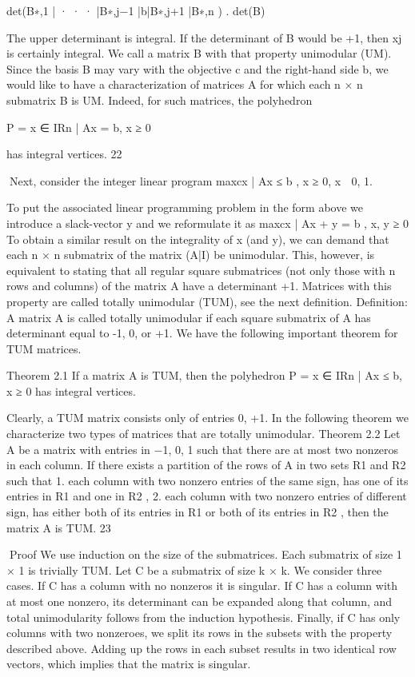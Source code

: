 \documentclass[titlepage]{book}
\theoremstyle{definition}
\begin{document}
det(B∗,1 | · · · |B∗,j−1 |b|B∗,j+1 |B∗,n )
.
det(B)

The upper determinant is integral. If the determinant of B would be +1, then xj is certainly integral.
We call a matrix B with that property unimodular (UM). Since the basis B may vary with the objective
c and the right-hand side b, we would like to have a characterization of matrices A for which each n × n
submatrix B is UM. Indeed, for such matrices, the polyhedron

P = {x ∈ IRn | Ax = b, x ≥ 0}

has integral vertices.
22

Next, consider the integer linear program
max{cx | Ax ≤ b , x ≥ 0, x ∈ {0, 1}}.

To put the associated linear programming problem in the form above we introduce a slack-vector y and
we reformulate it as
max{cx | Ax + y = b , x, y ≥ 0}
To obtain a similar result on the integrality of x (and y), we can demand that each n × n submatrix of the
matrix (A|I) be unimodular. This, however, is equivalent to stating that all regular square submatrices
(not only those with n rows and columns) of the matrix A have a determinant +1. Matrices with this
property are called totally unimodular (TUM), see the next definition.
Definition: A matrix A is called totally unimodular if each square submatrix of A has determinant equal
to -1, 0, or +1.
We have the following important theorem for TUM matrices.

Theorem 2.1 If a matrix A is TUM, then the polyhedron
P = {x ∈ IRn | Ax ≤ b, x ≥ 0}
has integral vertices.

Clearly, a TUM matrix consists only of entries 0, +1. In the following theorem we characterize two types
of matrices that are totally unimodular.
Theorem 2.2 Let A be a matrix with entries in {−1, 0, 1} such that there are at most two nonzeros in
each column. If there exists a partition of the rows of A in two sets R1 and R2 such that
1. each column with two nonzero entries of the same sign, has one of its entries in R1 and one in R2 ,
2. each column with two nonzero entries of different sign, has either both of its entries in R1 or both of
its entries in R2 ,
then the matrix A is TUM.
23

Proof
We use induction on the size of the submatrices. Each submatrix of size 1 × 1 is trivially TUM. Let C be
a submatrix of size k × k. We consider three cases. If C has a column with no nonzeros it is singular. If
C has a column with at most one nonzero, its determinant can be expanded along that column, and total
unimodularity follows from the induction hypothesis. Finally, if C has only columns with two nonzeroes,
we split its rows in the subsets with the property described above. Adding up the rows in each subset
results in two identical row vectors, which implies that the matrix is singular.
✷
\end{document}

